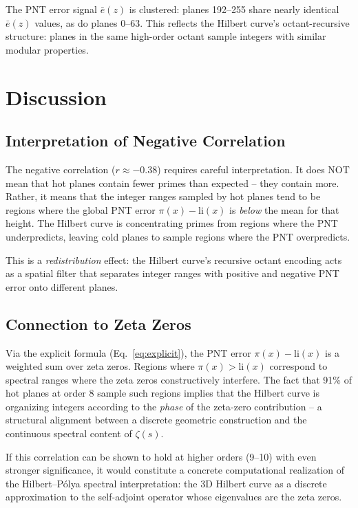 \documentclass[11pt,a4paper]{article}
\begin{document}
The PNT error signal $\bar{e}(z)$ is clustered: planes 192--255 share
nearly identical $\bar{e}(z)$ values, as do planes 0--63. This reflects
the Hilbert curve's octant-recursive structure: planes in the same
high-order octant sample integers with similar modular properties.

\section{Discussion}

\subsection{Interpretation of Negative Correlation}

The negative correlation ($r \approx -0.38$) requires careful
interpretation. It does NOT mean that hot planes contain fewer primes
than expected -- they contain more. Rather, it means that the integer
ranges sampled by hot planes tend to be regions where the global PNT
error $\pi(x) - \text{li}(x)$ is \emph{below} the mean for that height.
The Hilbert curve is concentrating primes from regions where the PNT
underpredicts, leaving cold planes to sample regions where the PNT
overpredicts.

This is a \emph{redistribution} effect: the Hilbert curve's recursive
octant encoding acts as a spatial filter that separates integer ranges
with positive and negative PNT error onto different planes.

\subsection{Connection to Zeta Zeros}

Via the explicit formula (Eq.~\ref{eq:explicit}), the PNT error
$\pi(x) - \text{li}(x)$ is a weighted sum over zeta zeros. Regions where
$\pi(x) > \text{li}(x)$ correspond to spectral ranges where the zeta
zeros constructively interfere. The fact that 91\% of hot planes at order
8 sample such regions implies that the Hilbert curve is organizing
integers according to the \emph{phase} of the zeta-zero contribution --
a structural alignment between a discrete geometric construction and the
continuous spectral content of $\zeta(s)$.

If this correlation can be shown to hold at higher orders (9--10) with
even stronger significance, it would constitute a concrete computational
realization of the Hilbert--P\'{o}lya spectral interpretation: the 3D
Hilbert curve as a discrete approximation to the self-adjoint operator
whose eigenvalues are the zeta zeros.
\end{document}
